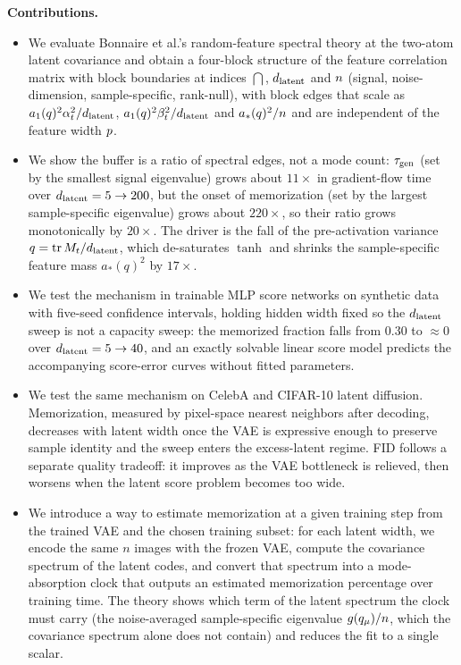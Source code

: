 \textbf{Contributions.}\par\vspace{-0.75em}
\begin{itemize}
  \setlength{\itemsep}{1pt}
  \setlength{\topsep}{0pt}
  \setlength{\partopsep}{0pt}
  \setlength{\parsep}{0pt}
  \item We evaluate Bonnaire et al.'s random-feature spectral theory at the two-atom latent covariance and obtain a four-block structure of the feature correlation matrix with block boundaries at indices $\dint$, $d_{\mathrm{latent}}$ and $n$ (signal, noise-dimension, sample-specific, rank-null), with block edges that scale as $a_1(q)^2\alpha_t^2/d_{\mathrm{latent}}$, $a_1(q)^2\beta_t^2/d_{\mathrm{latent}}$ and $a_*(q)^2/n$ and are independent of the feature width $p$.
  \item We show the buffer is a ratio of spectral edges, not a mode count: $\tau_{\mathrm{gen}}$ (set by the smallest signal eigenvalue) grows about $11\times$ in gradient-flow time over $d_{\mathrm{latent}}=5\to200$, but the onset of memorization (set by the largest sample-specific eigenvalue) grows about $220\times$, so their ratio grows monotonically by $20\times$. The driver is the fall of the pre-activation variance $q=\operatorname{tr}M_t/d_{\mathrm{latent}}$, which de-saturates $\tanh$ and shrinks the sample-specific feature mass $a_*(q)^2$ by $17\times$.
  \item We test the mechanism in trainable MLP score networks on synthetic data with five-seed confidence intervals, holding hidden width fixed so the $d_{\mathrm{latent}}$ sweep is not a capacity sweep: the memorized fraction falls from $0.30$ to $\approx 0$ over $d_{\mathrm{latent}}=5\to40$, and an exactly solvable linear score model predicts the accompanying score-error curves without fitted parameters.
  \item We test the same mechanism on CelebA and CIFAR-10 latent diffusion. Memorization, measured by pixel-space nearest neighbors after decoding, decreases with latent width once the VAE is expressive enough to preserve sample identity and the sweep enters the excess-latent regime. FID follows a separate quality tradeoff: it improves as the VAE bottleneck is relieved, then worsens when the latent score problem becomes too wide.
  \item We introduce a way to estimate memorization at a given training step from the trained VAE and the chosen training subset: for each latent width, we encode the same $n$ images with the frozen VAE, compute the covariance spectrum of the latent codes, and convert that spectrum into a mode-absorption clock that outputs an estimated memorization percentage over training time. The theory shows which term of the latent spectrum the clock must carry (the noise-averaged sample-specific eigenvalue $g(q_\mu)/n$, which the covariance spectrum alone does not contain) and reduces the fit to a single scalar.
\end{itemize}
